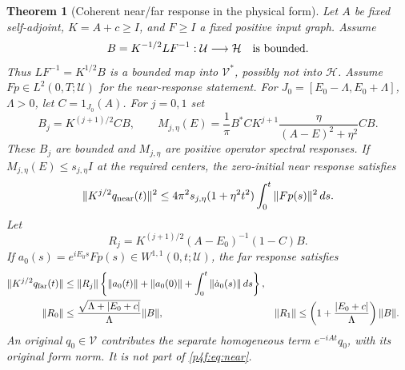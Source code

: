 \documentclass[11pt]{article}
\numberwithin{equation}{section}
\newtheorem{theorem}{Theorem}[section]
\theoremstyle{definition}
\theoremstyle{remark}
\begin{document}
\begin{theorem}[Coherent near/far response in the physical form]
\label{p4f:thm:hybrid}
Let $A$ be fixed self-adjoint, $K=A+c\ge I$, and
$F\ge I$ a fixed positive input graph. Assume
\[
 B=K^{-1/2}LF^{-1}:\mathcal U\longrightarrow\mathcal H
 \quad\hbox{is bounded}.
\]
Thus $LF^{-1}=K^{1/2}B$ is a bounded map into
$\mathcal V^*$, possibly not into $\mathcal H$.
Assume $Fp\in L^2(0,T;\mathcal U)$ for the near-response statement.
For $J_0=[E_0-\Lambda,E_0+\Lambda]$, $\Lambda>0$,
let $C=1_{J_0}(A)$. For $j=0,1$ set
\[
 B_j=K^{(j+1)/2}CB,\qquad
 M_{j,\eta}(E)=\frac1\pi B^*C K^{j+1}
                    \frac{\eta}{(A-E)^2+\eta^2}CB .
\]
These $B_j$ are bounded and $M_{j,\eta}$ are positive
operator spectral responses. If
$M_{j,\eta}(E)\le s_{j,\eta}I$ at the required centers,
the zero-initial near response satisfies
\begin{equation}\label{p4f:eq:near}
 \|K^{j/2}q_{\rm near}(t)\|^2
 \le4\pi^2s_{j,\eta}(1+\eta^2t^2)
                          \int_0^t\|Fp(s)\|^2\,ds .
\end{equation}
Let
\[
 R_j=K^{(j+1)/2}(A-E_0)^{-1}(1-C)B .
\]
If $a_0(s)=e^{iE_0s}Fp(s)\in W^{1,1}(0,t;\mathcal U)$,
the far response satisfies
\begin{align}
 \|K^{j/2}q_{\rm far}(t)\|
 &\le\|R_j\|
   \left\{\|a_0(t)\|+\|a_0(0)\|
                       +\int_0^t\|\dot a_0(s)\|\,ds\right\},
                       \label{p4f:eq:far}\\
 \|R_0\|&\le
       \frac{\sqrt{\Lambda+|E_0+c|}}{\Lambda}\|B\|,
 &\|R_1\|&\le
       \left(1+\frac{|E_0+c|}{\Lambda}\right)\|B\|.
                       \label{p4f:eq:farcoeff}
\end{align}
An original $q_0\in\mathcal V$ contributes the separate
homogeneous term $e^{-iAt}q_0$, with its original
form norm. It is not part of \eqref{p4f:eq:near}.
\end{theorem}
\end{document}
